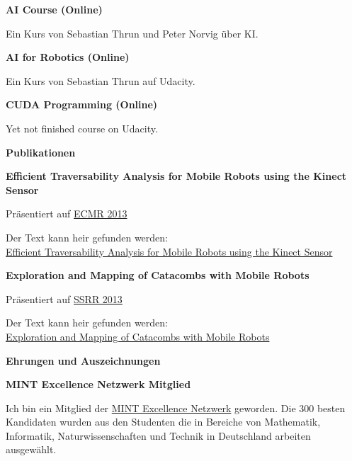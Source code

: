 \documentclass[a4paper,12pt,final]{memoir}
\newcommand{\Sep}{\vspace{1.5em}}
\newcommand{\SmallSep}{\vspace{0.5em}}
\newcommand{\CVSection}[1]
	{\Large\textbf{#1}\par
	\SmallSep\normalsize\normalfont}
\newcommand{\CVItem}[1]
	{\textbf{\color{MidnightBlue} #1}}
\begin{document}
\CVItem{AI Course (Online)}
\begin{compactitem}[\color{MidnightBlue}$\circ$]
	\item Ein Kurs von Sebastian Thrun und Peter Norvig \"{u}ber KI.
\end{compactitem}
\SmallSep

\CVItem{AI for Robotics (Online)}
\begin{compactitem}[\color{MidnightBlue}$\circ$]
	\item Ein Kurs von Sebastian Thrun auf Udacity.
\end{compactitem}
\SmallSep

\CVItem{CUDA Programming (Online)}
\begin{compactitem}[\color{MidnightBlue}$\circ$]
	\item Yet not finished course on Udacity.
\end{compactitem}
\SmallSep

\CVSection{Publikationen}
\CVItem{Efficient Traversability Analysis for Mobile Robots using the Kinect Sensor}
\begin{compactitem}[\color{MidnightBlue}$\circ$]
	\item Pr\"{a}sentiert auf \href{http://www.iri.upc.edu/ecmr13/#home}{ECMR 2013} 
	\item Der Text kann heir gefunden werden: \\\href{http://www.informatik.uni-freiburg.de/~stachnis/pdf/bogoslavskyi13ecmr.pdf}{Efficient Traversability Analysis for Mobile Robots using the Kinect Sensor} 
\end{compactitem}
\CVItem{Exploration and Mapping of Catacombs with Mobile Robots}
\begin{compactitem}[\color{MidnightBlue}$\circ$]
	\item Pr\"{a}sentiert auf \href{http://www.ssrr-conference.org/2013/}{SSRR 2013} 
	\item Der Text kann heir gefunden werden: \\\href{http://www.rovina-project.eu/system/papers/pdfs/000/000/005/original/rovina.pdf?1383745388}{Exploration and Mapping of Catacombs with Mobile Robots} 
\end{compactitem}
\SmallSep

\CVSection{Ehrungen und Auszeichnungen}
\CVItem{MINT Excellence Netzwerk Mitglied}
\begin{compactitem}[\color{MidnightBlue}$\circ$]
	\item Ich bin ein Mitglied der 
    \href{http://www.mlp.de/#/studenten/karriere/stipendienprogramme/mint-excellence}
    {MINT Excellence Netzwerk} geworden. Die 300 besten Kandidaten wurden aus den Studenten die in
    Bereiche von Mathematik, Informatik, Naturwissenschaften und Technik in
    Deutschland arbeiten ausgew\"{a}hlt.
\end{compactitem}
\Sep
\end{document}
